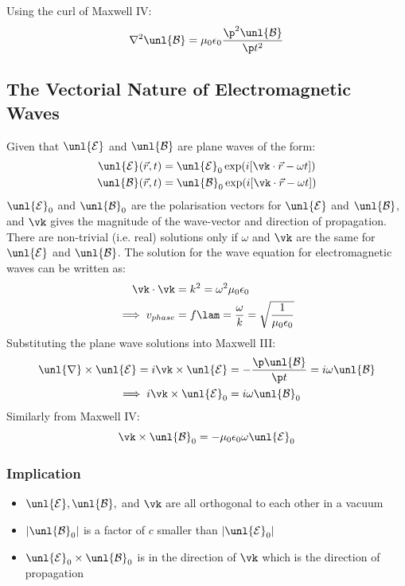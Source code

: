 \documentclass[a4paper, 11pt, normalem]{report}
\renewcommand\E{\mathcal{E}}
\newcommand\uE{\unl{\E}}
\renewcommand\B{\mathcal{B}}
\newcommand\uB{\unl{\B}}
\renewcommand\del{\unl{\nabla}}
\newcommand\eno{\epsilon_0}
\begin{document}
\chapter{}
Using the curl of Maxwell \RN{4}:
\begin{equation}
    \nabla^2\uB = \mu_0\eno\frac{\p^2\uB}{\p t^2}
\end{equation}

\section{The Vectorial Nature of Electromagnetic Waves}
Given that $\uE$ and $\uB$ are plane waves of the form:
\begin{align}
    \uE(\vec{r},t) &= \uE_0\exp(i[\vk\cdot\vec{r}-\omega t]) \\
    \uB(\vec{r},t) &= \uB_0\exp(i[\vk\cdot\vec{r}-\omega t])
\end{align}
$\uE_0$ and $\uB_0$ are the polarisation vectors for $\uE$ and $\uB$, and $\vk$ gives the magnitude of the wave-vector and direction of propagation. \\
There are non-trivial (i.e. real) solutions only if $\omega$ and $\vk$ are the same for $\uE$ and $\uB$.
The solution for the wave equation for electromagnetic waves can be written as:
\begin{align}
    \vk\cdot\vk &= k^2 = \omega^2\mu_0\eno \\
    \implies v_{phase} &= f\lam = \frac{\omega}{k} = \sqrt{\frac{1}{\mu_0\eno}}
\end{align}
Substituting the plane wave solutions into Maxwell \RN{3}:
\begin{align}
    \del \times \uE = i\vk \times \uE &= -\frac{\p\uB}{\p t} = i\omega\uB \\
    \implies i\vk\times\uE_0 &= i\omega\uB_0
\end{align}
Similarly from Maxwell \RN{4}:
\begin{equation}
    \vk \times \uB_0 = -\mu_0\eno\omega\uE_0
\end{equation}

\subsection{Implication}
\begin{itemize}
    \item $\uE, \uB,$ and $\vk$ are all orthogonal to each other in a vacuum
    \item $|\uB_0|$ is a factor of $c$ smaller than $|\uE_0|$
    \item $\uE_0\times\uB_0$ is in the direction of $\vk$ which is the direction of propagation
\end{itemize}
\end{document}
